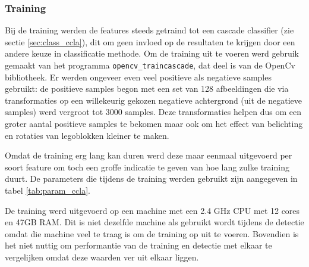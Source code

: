 
\subsubsection*{Training}

Bij de training werden de features steeds getraind tot een cascade classifier (zie sectie \ref{sec:class_ccla}), dit om geen invloed op de resultaten te krijgen door een andere keuze in classificatie methode. Om de training uit te voeren werd gebruik gemaakt van het programma \texttt{opencv\_traincascade}, dat deel is van de OpenCv bibliotheek. Er werden ongeveer even veel positieve als negatieve samples gebruikt: de positieve samples begon met een set van 128 afbeeldingen die via transformaties op een willekeurig gekozen negatieve achtergrond (uit de negatieve samples) werd vergroot tot 3000 samples. Deze transformaties helpen dus om een groter aantal positieve samples te bekomen maar ook om het effect van belichting en rotaties van legoblokken kleiner te maken. 

Omdat de training erg lang kan duren werd deze maar eenmaal uitgevoerd per soort feature om toch een groffe indicatie te geven van hoe lang zulke training duurt. De parameters die tijdens de training werden gebruikt zijn aangegeven in tabel \ref{tab:param_ccla}. 

De training werd uitgevoerd op een machine met een 2.4 GHz CPU met 12 cores en 47GB RAM. Dit is niet dezelfde machine als gebruikt wordt tijdens de detectie omdat die machine veel te traag is om de training op uit te voeren. Bovendien is het niet nuttig om performantie van de training en detectie met elkaar te vergelijken omdat deze waarden ver uit elkaar liggen.


